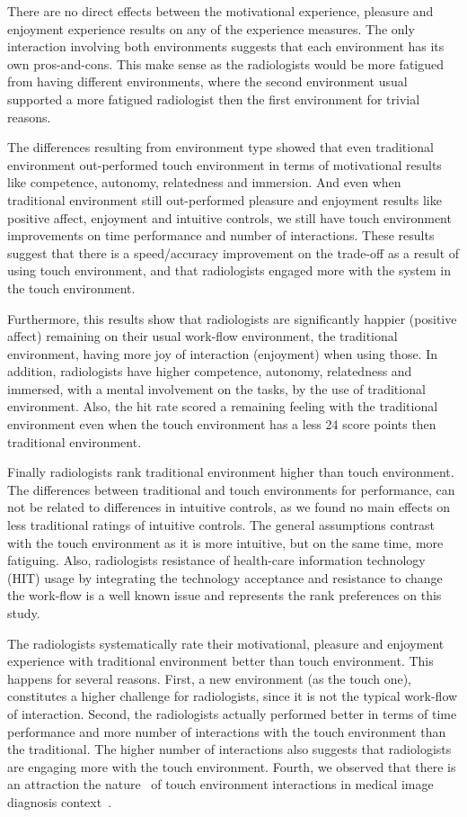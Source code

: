 \documentclass{sigchi}
\begin{document}
There are no direct effects between the motivational experience, pleasure and enjoyment experience results on any of the experience measures. The only interaction involving both environments suggests that each environment has its own pros-and-cons. This make sense as the radiologists would be more fatigued from having different environments, where the second environment usual supported a more fatigued radiologist then the first environment for trivial reasons.

The differences resulting from environment type showed that even traditional environment out-performed touch environment in terms of motivational results like competence, autonomy, relatedness and immersion. And even when traditional environment still out-performed pleasure and enjoyment results like positive affect, enjoyment and intuitive controls, we still have touch environment improvements on time performance and number of interactions. These results suggest that there is a speed/accuracy improvement on the trade-off as a result of using touch environment, and that radiologists engaged more with the system in the touch environment.

Furthermore, this results show that radiologists are significantly happier (positive affect) remaining on their usual work-flow environment, the traditional environment, having more joy of interaction (enjoyment) when using those. In addition, radiologists have higher competence, autonomy, relatedness and immersed, with a mental involvement on the tasks, by the use of traditional environment. Also, the hit rate scored a remaining feeling with the traditional environment even when the touch environment has a less 24 score points then traditional environment.

Finally radiologists rank traditional environment higher than touch environment. The differences between traditional and touch environments for performance, can not be related to differences in intuitive controls, as we found no main effects on less traditional ratings of intuitive controls. The general assumptions contrast with the touch environment as it is more intuitive, but on the same time, more fatiguing. Also, radiologists resistance of health-care information technology~\cite{bloom1988structure} (HIT) usage by integrating the technology acceptance and resistance to change the work-flow is a well known issue and represents the rank preferences on this study.

The radiologists systematically rate their motivational, pleasure and enjoyment experience with traditional environment better than touch environment. This happens for several reasons. First, a new environment (as the touch one), constitutes a higher challenge for radiologists, since it is not the typical work-flow of interaction. Second, the radiologists actually performed better in terms of time performance and more number of interactions with the touch environment than the traditional. The higher number of interactions also suggests that radiologists are engaging more with the touch environment. Fourth, we observed that there
is an attraction the  nature~\cite{kin2009determining} of touch environment interactions in medical image diagnosis context~\cite{seibel2005medical}.
\end{document}
